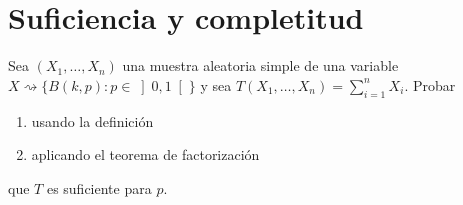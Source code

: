 \newpage
\section{Suficiencia y completitud}

\begin{ejercicio}
    Sea $(X_1, \ldots, X_n)$ una muestra aleatoria simple de una variable $X\rightsquigarrow\{B(k,p) : p\in \left]0,1\right[\}$ y sea $T(X_1, \ldots, X_n) = \sum\limits_{i=1}^n X_i$. Probar
    \begin{enumerate}[label=\alph*)]
        \item usando la definición
        \item aplicando el teorema de factorización
    \end{enumerate}
    que $T$ es suficiente para $p$.


\end{ejercicio}
